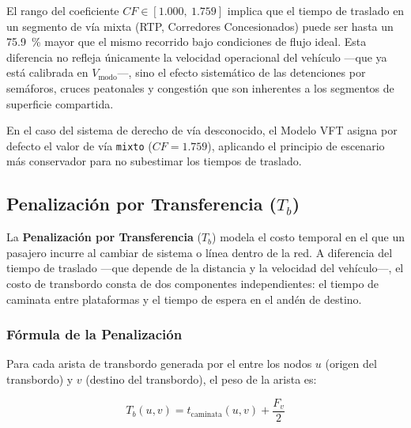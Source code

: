 El rango del coeficiente $CF \in [1.000,\ 1.759]$ implica que el tiempo de
traslado en un segmento de vía mixta (RTP, Corredores Concesionados) puede ser
hasta un 75.9~\% mayor que el mismo recorrido bajo condiciones de flujo ideal.
Esta diferencia no refleja únicamente la velocidad operacional del vehículo —que
ya está calibrada en $V_{\text{modo}}$—, sino el efecto sistemático de las
detenciones por semáforos, cruces peatonales y congestión que son inherentes a
los segmentos de superficie compartida.

En el caso del sistema de derecho de vía desconocido, el Modelo VFT asigna por
defecto el valor de vía \texttt{mixto} ($CF = 1.759$), aplicando el principio de
escenario más conservador para no subestimar los tiempos de traslado.

\subsection{Penalización por Transferencia (\texorpdfstring{$T_b$}{Tb})}
\label{subsec:res-penalizacion-transferencia}

La \textbf{Penalización por Transferencia} ($T_b$) modela el costo temporal en
el que un pasajero incurre al cambiar de sistema o línea dentro de la red. A
diferencia del tiempo de traslado —que depende de la distancia y la velocidad
del vehículo—, el costo de transbordo consta de dos componentes independientes:
el tiempo de caminata entre plataformas y el tiempo de espera en el andén de
destino.

\subsubsection{Fórmula de la Penalización}
\label{subsubsec:formula-tb}

Para cada arista de transbordo generada por el
 entre los nodos $u$ (origen del transbordo)
y $v$ (destino del transbordo), el peso de la arista es:

\begin{equation}
    T_b(u, v) = t_{\text{caminata}}(u, v) + \frac{F_v}{2}
    \label{eq:tb-formula}
\end{equation}

